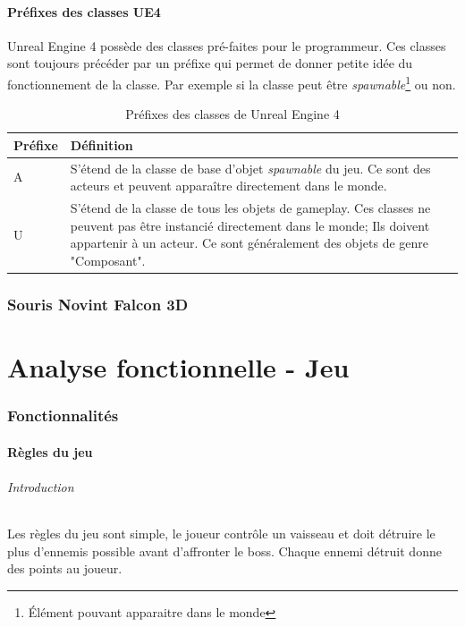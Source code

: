 \documentclass[11pt, a4paper, oneside]{article}
\begin{document}
\subsection{Préfixes des classes UE4}
Unreal Engine 4 possède des classes pré-faites pour le programmeur. Ces classes sont toujours précéder par un préfixe qui permet de donner petite idée du fonctionnement de la classe. Par exemple si la classe peut être \emph{spawnable}\footnote{Élément pouvant apparaitre dans le monde} ou non.
\begin{table}[h]
	\begin{center}
		\begin{tabularx}{\textwidth}{ l X }
			\hline
			\textbf{Préfixe} & \textbf{Définition}\\
			\hline
			\hline
			A & S'étend de la classe de base d'objet \emph{spawnable} du jeu. Ce sont des acteurs et peuvent apparaître directement dans le monde.\\
			\hline
			U & S'étend de la classe de tous les objets de gameplay. Ces classes ne peuvent pas être instancié directement dans le monde; Ils doivent appartenir à un acteur. Ce sont généralement des objets de genre "Composant".\\
			\hline
		\end{tabularx}
		\caption{Préfixes des classes de Unreal Engine 4}
		\label{table:prefixesclasses}
	\end{center}
\end{table}
\newpage

\section{Souris Novint Falcon 3D}
\newpage
\part{Analyse fonctionnelle - Jeu}
\section{Fonctionnalités}
\subsection{Règles du jeu}
\paragraph{Introduction}
Les règles du jeu sont simple, le joueur contrôle un vaisseau et doit détruire le plus d'ennemis possible avant d'affronter le boss. Chaque ennemi détruit donne des points au joueur.
\end{document}
